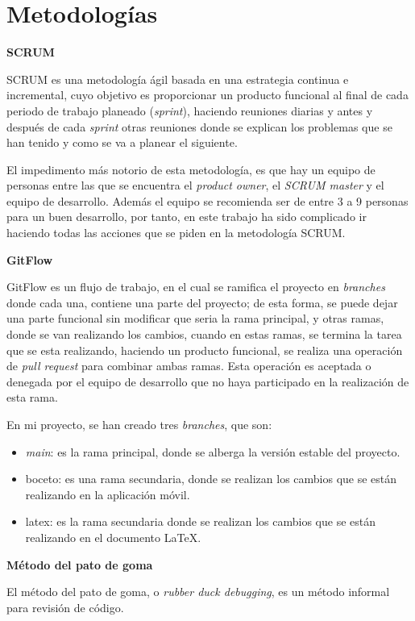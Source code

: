 
\section{Metodologías}
\textbf{SCRUM}

    SCRUM es una metodología ágil basada en una estrategia continua e incremental, cuyo objetivo es proporcionar un producto funcional al final de cada periodo de trabajo planeado (\textit{sprint}), haciendo reuniones diarias y antes y después de cada \textit{sprint} otras reuniones donde se explican los problemas que se han tenido y como se va a planear el siguiente.

    El impedimento más notorio de esta metodología, es que hay un equipo de personas entre las que se encuentra el \textit{product owner}, el \textit{SCRUM master} y el equipo de desarrollo. Además el equipo se recomienda ser de entre 3 a 9 personas para un buen desarrollo, por tanto, en este trabajo ha sido complicado ir haciendo todas las acciones que se piden en la metodología SCRUM.

\textbf{GitFlow}

    GitFlow es un flujo de trabajo, en el cual se ramifica el proyecto en \textit{branches} donde cada una, contiene una parte del proyecto; de esta forma, se puede dejar una parte funcional sin modificar que seria la rama principal, y otras ramas, donde se van realizando los cambios, cuando en estas ramas, se termina la tarea que se esta realizando, haciendo un producto funcional, se realiza una operación de \textit{pull request} para combinar ambas ramas. Esta operación es aceptada o denegada por el equipo de desarrollo que no haya participado en la realización de esta rama.

    En mi proyecto, se han creado tres \textit{branches}, que son:
    \begin{itemize}
        \item \textit{main}: es la rama principal, donde se alberga la versión estable del proyecto.
        \item boceto: es una rama secundaria, donde se realizan los cambios que se están realizando en la aplicación móvil.
        \item latex: es la rama secundaria donde se realizan los cambios que se están realizando en el documento LaTeX.
    \end{itemize}
\textbf{Método del pato de goma}

    El método del pato de goma, o \textit{rubber duck debugging}, es un método informal para revisión de código.

